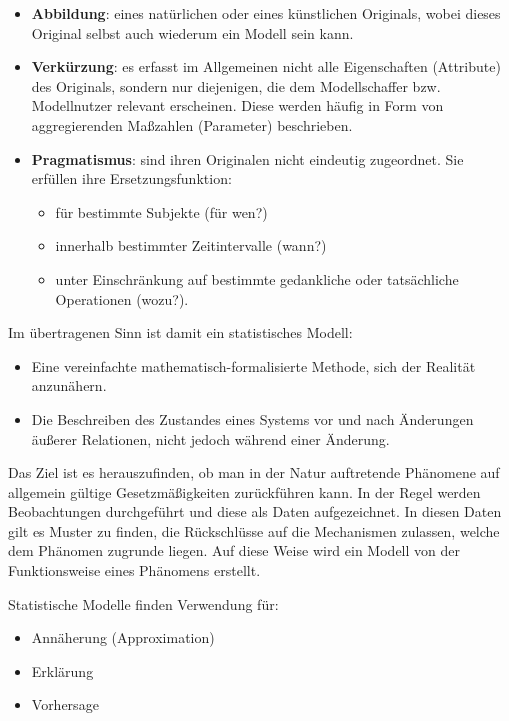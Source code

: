 \documentclass[]{article}
\providecommand{\tightlist}{%
  \setlength{\itemsep}{0pt}\setlength{\parskip}{0pt}}
\begin{document}
\begin{itemize}
\item
  \textbf{Abbildung}: eines natürlichen oder eines künstlichen
  Originals, wobei dieses Original selbst auch wiederum ein Modell sein
  kann.
\item
  \textbf{Verkürzung}: es erfasst im Allgemeinen nicht alle
  Eigenschaften (Attribute) des Originals, sondern nur diejenigen, die
  dem Modellschaffer bzw. Modellnutzer relevant erscheinen. Diese werden
  häufig in Form von aggregierenden Maßzahlen (Parameter) beschrieben.
\item
  \textbf{Pragmatismus}: sind ihren Originalen nicht eindeutig
  zugeordnet. Sie erfüllen ihre Ersetzungsfunktion:

  \begin{itemize}
  \tightlist
  \item
    für bestimmte Subjekte (für wen?)
  \item
    innerhalb bestimmter Zeitintervalle (wann?)
  \item
    unter Einschränkung auf bestimmte gedankliche oder tatsächliche
    Operationen (wozu?).
  \end{itemize}
\end{itemize}

Im übertragenen Sinn ist damit ein statistisches Modell:

\begin{itemize}
\tightlist
\item
  Eine vereinfachte mathematisch-formalisierte Methode, sich der
  Realität anzunähern.
\item
  Die Beschreiben des Zustandes eines Systems vor und nach Änderungen
  äußerer Relationen, nicht jedoch während einer Änderung.
\end{itemize}

Das Ziel ist es herauszufinden, ob man in der Natur auftretende
Phänomene auf allgemein gültige Gesetzmäßigkeiten zurückführen kann. In
der Regel werden Beobachtungen durchgeführt und diese als Daten
aufgezeichnet. In diesen Daten gilt es Muster zu finden, die
Rückschlüsse auf die Mechanismen zulassen, welche dem Phänomen zugrunde
liegen. Auf diese Weise wird ein Modell von der Funktionsweise eines
Phänomens erstellt.

Statistische Modelle finden Verwendung für:

\begin{itemize}
\tightlist
\item
  Annäherung (Approximation)
\item
  Erklärung
\item
  Vorhersage
\end{itemize}
\end{document}
